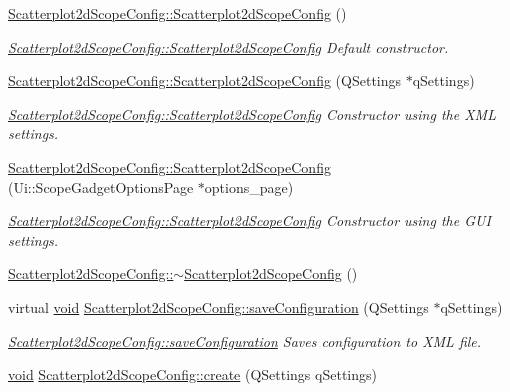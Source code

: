 \begin{DoxyCompactItemize}
\hyperlink{group___scope_plugin_gafdcf057f46ce7c284b969bf8d0a8fe0e}{Scatterplot2d\-Scope\-Config\-::\-Scatterplot2d\-Scope\-Config} ()
\begin{DoxyCompactList}\small\item\em \hyperlink{group___scope_plugin_gafdcf057f46ce7c284b969bf8d0a8fe0e}{Scatterplot2d\-Scope\-Config\-::\-Scatterplot2d\-Scope\-Config} Default constructor. \end{DoxyCompactList}\item 
\hyperlink{group___scope_plugin_ga3f0c68575d63ef6831f8e28d5835e056}{Scatterplot2d\-Scope\-Config\-::\-Scatterplot2d\-Scope\-Config} (Q\-Settings $\ast$q\-Settings)
\begin{DoxyCompactList}\small\item\em \hyperlink{group___scope_plugin_gafdcf057f46ce7c284b969bf8d0a8fe0e}{Scatterplot2d\-Scope\-Config\-::\-Scatterplot2d\-Scope\-Config} Constructor using the X\-M\-L settings. \end{DoxyCompactList}\item 
\hyperlink{group___scope_plugin_gab4f886463a61e05057f4fc3043b08f9e}{Scatterplot2d\-Scope\-Config\-::\-Scatterplot2d\-Scope\-Config} (Ui\-::\-Scope\-Gadget\-Options\-Page $\ast$options\-\_\-page)
\begin{DoxyCompactList}\small\item\em \hyperlink{group___scope_plugin_gafdcf057f46ce7c284b969bf8d0a8fe0e}{Scatterplot2d\-Scope\-Config\-::\-Scatterplot2d\-Scope\-Config} Constructor using the G\-U\-I settings. \end{DoxyCompactList}\item 
\hyperlink{group___scope_plugin_gad761d10c520b7bbeabfd1eac13b8d6d9}{Scatterplot2d\-Scope\-Config\-::$\sim$\-Scatterplot2d\-Scope\-Config} ()
\item 
virtual \hyperlink{group___u_a_v_objects_plugin_ga444cf2ff3f0ecbe028adce838d373f5c}{void} \hyperlink{group___scope_plugin_ga37a87c7a797180e5634b24238137d996}{Scatterplot2d\-Scope\-Config\-::save\-Configuration} (Q\-Settings $\ast$q\-Settings)
\begin{DoxyCompactList}\small\item\em \hyperlink{group___scope_plugin_ga37a87c7a797180e5634b24238137d996}{Scatterplot2d\-Scope\-Config\-::save\-Configuration} Saves configuration to X\-M\-L file. \end{DoxyCompactList}\item 
\hyperlink{group___u_a_v_objects_plugin_ga444cf2ff3f0ecbe028adce838d373f5c}{void} \hyperlink{group___scope_plugin_ga5b5afb4928f9ea75b7606be6a4138a3d}{Scatterplot2d\-Scope\-Config\-::create} (Q\-Settings q\-Settings)

\end{DoxyCompactItemize}
